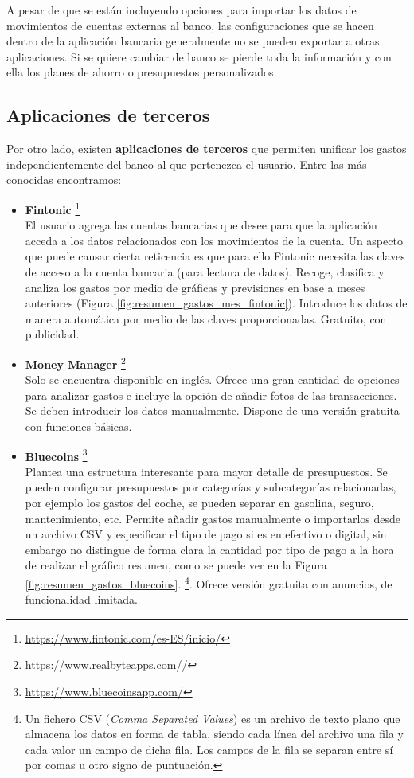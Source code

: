 A pesar de que se están incluyendo opciones para importar los datos de movimientos de 
cuentas externas al banco, las configuraciones que se hacen dentro de 
la aplicación bancaria generalmente no se pueden exportar a otras aplicaciones.
Si se quiere cambiar de banco se pierde toda la información 
y con ella los planes de ahorro o presupuestos personalizados.

\subsection{Aplicaciones de terceros}
Por otro lado, existen \textbf{aplicaciones de terceros} que permiten unificar los gastos 
independientemente del banco al que pertenezca el usuario. Entre las más conocidas 
encontramos:

\begin{itemize}
    \item \textbf{Fintonic} \footnote{\url{https://www.fintonic.com/es-ES/inicio/}} \\
    El usuario agrega las cuentas bancarias que desee para que la aplicación 
    acceda a los datos relacionados con los movimientos de la cuenta. 
    Un aspecto que puede causar cierta reticencia es que para ello Fintonic necesita las claves de acceso a la cuenta bancaria (para lectura de datos).
    Recoge, clasifica y analiza los gastos por medio de gráficas y previsiones en base a meses anteriores (Figura \ref{fig:resumen_gastos_mes_fintonic}).
    Introduce los datos de manera automática por medio de las claves proporcionadas. 
    Gratuito, con publicidad.

    \item \textbf{Money Manager}  \footnote{\url{https://www.realbyteapps.com//}} \\
    Solo se encuentra disponible en inglés. Ofrece una gran cantidad de opciones
    para analizar gastos e incluye la opción de añadir fotos de las transacciones. 
    Se deben introducir los datos manualmente. 
    Dispone de una versión gratuita con funciones básicas.

    \item \textbf{Bluecoins} \footnote{\url{https://www.bluecoinsapp.com/}} \\
    Plantea una estructura interesante para mayor detalle de presupuestos. 
    Se pueden configurar presupuestos por categorías y subcategorías relacionadas, por ejemplo 
    los gastos del coche, se pueden separar en gasolina, seguro, mantenimiento, etc. 
    Permite añadir gastos manualmente o importarlos desde un archivo CSV y especificar 
    el tipo de pago si es en efectivo o digital, sin embargo no distingue de forma clara la cantidad por tipo de pago a la hora de realizar el gráfico resumen, como se puede ver en la Figura \ref{fig:resumen_gastos_bluecoins}.
    \footnote{Un fichero CSV (\textit{Comma Separated Values}) es un archivo de texto plano 
    que almacena los datos en forma de tabla, siendo cada línea del archivo una fila y 
    cada valor un campo de dicha fila. Los campos de la fila se separan entre sí por comas 
    u otro signo de puntuación.}. 
    Ofrece versión gratuita con anuncios, de funcionalidad limitada.


\end{itemize}
